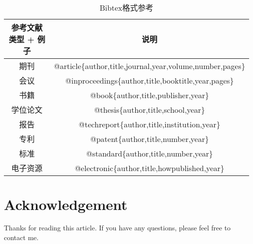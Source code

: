 \documentclass[12pt,a4paper]{article}%
\begin{document}
	\begin{table}[h!]
		\begin{center}
			\caption{Bibtex格式参考}
			\begin{tabular}{|c|c|}
				\hline
				\textbf{参考文献类型 + 例子} & \textbf{说明} \\
				\hline
				期刊 & @article\{author,title,journal,year,volume,number,pages\} \\
				\hline
				会议 & @inproceedings\{author,title,booktitle,year,pages\} \\
				\hline
				书籍 & @book\{author,title,publisher,year\} \\
				\hline
				学位论文 & @thesis\{author,title,school,year\} \\
				\hline
				报告 & @techreport\{author,title,institution,year\} \\
				\hline
				专利 & @patent\{author,title,number,year\} \\
				\hline
				标准 & @standard\{author,title,number,year\} \\
				\hline
				电子资源 & @electronic\{author,title,howpublished,year\} \\
				\hline
			\end{tabular}
		\end{center}
	\end{table}
    
	\section{Acknowledgement}
	Thanks for reading this article. If you have any questions, please feel free to contact me.
\end{document}
